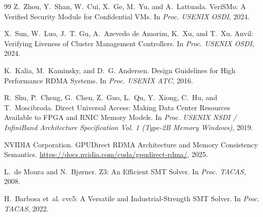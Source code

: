 \documentclass[11pt,a4paper]{article}
\begin{document}
\begin{thebibliography}{99}
Z.~Zhou, Y.~Shan, W.~Cui, X.~Ge, M.~Yu, and A.~Lattuada.
\newblock VeriSMo: A Verified Security Module for Confidential VMs.
\newblock In \emph{Proc. USENIX OSDI}, 2024.

X.~Sun, W.~Luo, J.~T. Gu, A.~Azevedo de Amorim, K.~Xu, and T.~Xu.
\newblock Anvil: Verifying Liveness of Cluster Management Controllers.
\newblock In \emph{Proc. USENIX OSDI}, 2024.

K.~Kalia, M.~Kaminsky, and D.~G. Andersen.
\newblock Design Guidelines for High Performance RDMA Systems.
\newblock In \emph{Proc. USENIX ATC}, 2016.

R.~Shu, P.~Cheng, G.~Chen, Z.~Guo, L.~Qu, Y.~Xiong, C.~Hu, and T.~Moscibroda.
\newblock Direct Universal Access: Making Data Center Resources Available to FPGA and RNIC Memory Models.
\newblock In \emph{Proc. USENIX NSDI / InfiniBand Architecture Specification Vol. 1 (Type-2B Memory Windows)}, 2019.

NVIDIA Corporation.
\newblock GPUDirect RDMA Architecture and Memory Consistency Semantics.
\newblock \url{https://docs.nvidia.com/cuda/gpudirect-rdma/}, 2025.

L.~de Moura and N.~Bj{\o}rner.
\newblock Z3: An Efficient SMT Solver.
\newblock In \emph{Proc. TACAS}, 2008.

H.~Barbosa et~al.
\newblock cvc5: A Versatile and Industrial-Strength SMT Solver.
\newblock In \emph{Proc. TACAS}, 2022.

\end{thebibliography}
\end{document}
